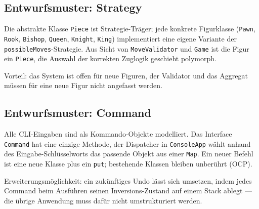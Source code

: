 \documentclass[a4paper,12pt]{article}
\begin{document}
\subsection*{Entwurfsmuster: Strategy}

Die abstrakte Klasse \texttt{Piece} ist Strategie-Träger; jede konkrete Figurklasse
(\texttt{Pawn}, \texttt{Rook}, \texttt{Bishop}, \texttt{Queen}, \texttt{Knight}, \texttt{King})
implementiert eine eigene Variante der \texttt{possibleMoves}-Strategie. Aus Sicht von
\texttt{MoveValidator} und \texttt{Game} ist die Figur ein \texttt{Piece}, die Auswahl der
korrekten Zuglogik geschieht polymorph.


Vorteil: das System ist offen für neue Figuren, der Validator und das Aggregat müssen für eine
neue Figur nicht angefasst werden.

\subsection*{Entwurfsmuster: Command}

Alle CLI-Eingaben sind als Kommando-Objekte modelliert. Das Interface \texttt{Command} hat eine
einzige Methode, der Dispatcher in \texttt{ConsoleApp} wählt anhand des Eingabe-Schlüsselworts das
passende Objekt aus einer \texttt{Map}. Ein neuer Befehl ist eine neue Klasse plus ein
\texttt{put}; bestehende Klassen bleiben unberührt (OCP).


Erweiterungsmöglichkeit: ein zukünftiges Undo lässt sich umsetzen, indem jedes Command beim
Ausführen seinen Inversions-Zustand auf einem Stack ablegt --- die übrige Anwendung muss dafür
nicht umstrukturiert werden.
\end{document}
